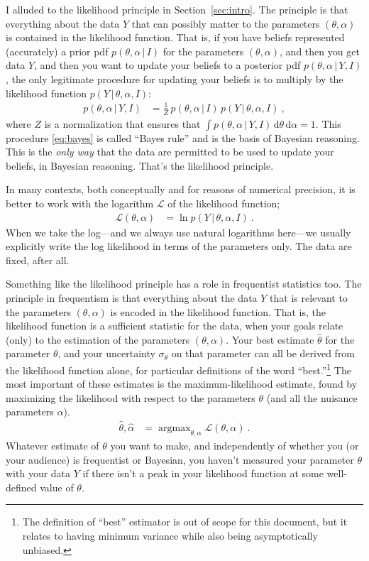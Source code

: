 \documentclass{article}
\newcommand{\sectionname}{Section}
\newcommand{\secref}[1]{\sectionname~\ref{#1}}
\newcommand{\dd}{\mathrm{d}}
\newcommand{\given}{\,|\,}
\DeclareMathOperator*{\argmax}{argmax}
\begin{document}
I alluded to the likelihood principle in \secref{sec:intro}.
The principle is that everything about the data $Y$ that can possibly matter to the parameters $(\theta,\alpha)$ is contained in the likelihood function.
That is, if you have beliefs represented (accurately) a prior pdf $p(\theta,\alpha\given I)$ for the parameters $(\theta,\alpha)$,
and then you get data $Y$,
and then you want to update your beliefs to a posterior pdf $p(\theta,\alpha\given Y,I)$, the only legitimate procedure for updating your beliefs is to multiply by the likelihood function $p(Y\given\theta,\alpha,I)$:
\begin{align}
    p(\theta,\alpha\given Y,I) &= \frac{1}{Z}\,p(\theta,\alpha\given I)\,p(Y\given\theta,\alpha,I) ~,\label{eq:bayes}
\end{align}
where $Z$ is a normalization that ensures that $\int p(\theta,\alpha\given Y,I)\,\dd\theta\,\dd\alpha=1$.
This procedure \eqref{eq:bayes} is called ``Bayes rule'' and is the basis of Bayesian reasoning.
This is the \emph{only way} that the data are permitted to be used to update your beliefs, in Bayesian reasoning.
That's the likelihood principle.

In many contexts, both conceptually and for reasons of numerical precision, it is better to work with the logarithm $\mathscr{L}$ of the likelihood function;
\begin{align}
    \mathscr{L}(\theta,\alpha) &= \ln p(Y\given\theta,\alpha,I) ~.
\end{align}
When we take the log---and we always use natural logarithms here---we usually explicitly write the log likelihood in terms of the parameters only.
The data are fixed, after all.

Something like the likelihood principle has a role in frequentist statistics too.
The principle in frequentism is that everything about the data $Y$ that is relevant to the parameters $(\theta,\alpha)$ is encoded in the likelihood function.
That is, the likelihood function is a sufficient statistic for the data, when your goals relate (only) to the estimation of the parameters $(\theta,\alpha)$.
Your best estimate $\hat{\theta}$ for the parameter $\theta$, and your uncertainty $\sigma_\theta$ on that parameter can all be derived from the likelihood function alone, for particular definitions of the word ``best.''\footnote{%
The definition of ``best'' estimator is out of scope for this document, but it relates to having minimum variance while also being asymptotically unbiased.}
The most important of these estimates is the maximum-likelihood estimate, found by maximizing the likelihood with respect to the parameters $\theta$ (and all the nuisance parameters $\alpha$).
\begin{align}
    \hat{\theta},\hat{\alpha} &= \argmax_{\theta,\alpha} \mathscr{L}(\theta,\alpha) ~.
\end{align}
Whatever estimate of $\theta$ you want to make, and independently of whether you (or your audience) is frequentist or Bayesian, you haven't measured your parameter $\theta$ with your data $Y$ if there isn't a peak in your likelihood function at some well-defined value of $\theta$.
\end{document}
